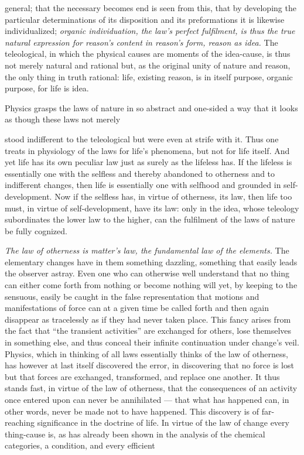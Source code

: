 \documentclass[12pt,a4paper]{book}
\begin{document}
general; that the necessary becomes end is seen from this, that by developing the
particular determinations of its disposition and its preformations it is likewise
individualized; \emph{organic individuation, the law's perfect fulfilment, is
thus the true natural expression for reason's content in reason's form, reason as
idea.} The teleological, in which the physical causes are moments of the
idea-cause, is thus not merely natural and rational but, as the original unity of
nature and reason, the only thing in truth rational: life, existing reason, is in
itself purpose, organic purpose, for life is idea.

Physics grasps the laws of nature in so abstract and one-sided a way that it
looks as though these laws not merely

stood indifferent to the teleological but were even at strife with it. Thus one
treats in physiology of the laws for life's phenomena, but not for life itself.
And yet life has its own peculiar law just as surely as the lifeless has. If the
lifeless is essentially one with the selfless and thereby abandoned to otherness
and to indifferent changes, then life is essentially one with selfhood and
grounded in self-development. Now if the selfless has, in virtue of otherness,
its law, then life too must, in virtue of self-development, have its law: only in
the idea, whose teleology subordinates the lower law to the higher, can the
fulfilment of the laws of nature be fully cognized.

\emph{The law of otherness is matter's law, the fundamental law of the elements.}
The elementary changes have in them something dazzling, something that easily
leads the observer astray. Even one who can otherwise well understand that no
thing can either come forth from nothing or become nothing will yet, by keeping
to the sensuous, easily be caught in the false representation that motions and
manifestations of force can at a given time be called forth and then again
disappear as tracelessly as if they had never taken place. This fancy arises
from the fact that ``the transient activities'' are exchanged for others, lose
themselves in something else, and thus conceal their infinite continuation under
change's veil. Physics, which in thinking of all laws essentially thinks of the
law of otherness, has however at last itself discovered the error, in discovering
that no force is lost but that forces are exchanged, transformed, and replace one
another. It thus stands fast, in virtue of the law of otherness, that the
consequences of an activity once entered upon can never be annihilated --- that
what has happened can, in other words, never be made not to have happened. This
discovery is of far-reaching significance in the doctrine of life. In virtue of
the law of change every thing-cause is, as has already been shown in the analysis
of the chemical categories, a condition, and every efficient
\end{document}
